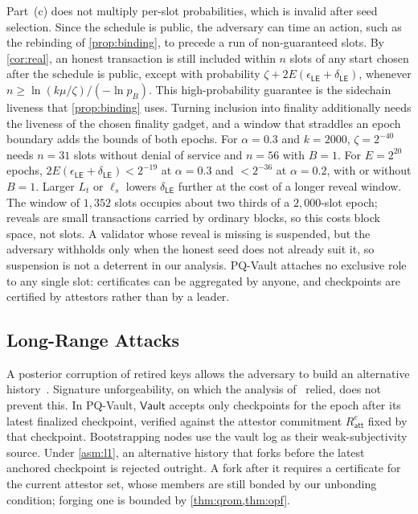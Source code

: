 \documentclass[10pt,journal,compsoc]{IEEEtran}
\theoremstyle{tplain}
\theoremstyle{tdef}
\theoremstyle{remark}
\newcommand{\Ratt}{R_{\mathsf{att}}}
\newcommand{\Vault}{\mathsf{Vault}}
\begin{document}
Part~(c) does not multiply per-slot probabilities, which is invalid after seed selection. Since the schedule is public, the adversary can time an action, such as the rebinding of \cref{prop:binding}, to precede a run of non-guaranteed slots. By \cref{cor:real}, an honest transaction is still included within $n$ slots of any start chosen after the schedule is public, except with probability $\zeta+2E(\epsilon_{\mathsf{LE}}+\delta_{\mathsf{LE}})$, whenever $n\ge\ln(k\mu/\zeta)/(-\ln p_B)$. This high-probability guarantee is the sidechain liveness that \cref{prop:binding} uses. Turning inclusion into finality additionally needs the liveness of the chosen finality gadget, and a window that straddles an epoch boundary adds the bounds of both epochs. For $\alpha=0.3$ and $k=2000$, $\zeta=2^{-40}$ needs $n=31$ slots without denial of service and $n=56$ with $B=1$. For $E=2^{20}$ epochs, $2E(\epsilon_{\mathsf{LE}}+\delta_{\mathsf{LE}})<2^{-19}$ at $\alpha=0.3$ and $<2^{-36}$ at $\alpha=0.2$, with or without $B=1$. Larger $L_t$ or $\ell_s$ lowers $\delta_{\mathsf{LE}}$ further at the cost of a longer reveal window. The window of $1{,}352$ slots occupies about two thirds of a $2{,}000$-slot epoch; reveals are small transactions carried by ordinary blocks, so this costs block space, not slots. A validator whose reveal is missing is suspended, but the adversary withholds only when the honest seed does not already suit it, so suspension is not a deterrent in our analysis. PQ-Vault attaches no exclusive role to any single slot: certificates can be aggregated by anyone, and checkpoints are certified by attestors rather than by a leader.

\subsection{Long-Range Attacks}\label{S-cons-longrange}

A posterior corruption of retired keys allows the adversary to build an alternative history~\cite{gazi2018stakebleeding,deirmentzoglou2019survey}. Signature unforgeability, on which the analysis of~\cite{myeprint} relied, does not prevent this. In PQ-Vault, $\Vault$ accepts only checkpoints for the epoch after its latest finalized checkpoint, verified against the attestor commitment $\Ratt^{e}$ fixed by that checkpoint. Bootstrapping nodes use the vault log as their weak-subjectivity source. Under \cref{asm:l1}, an alternative history that forks before the latest anchored checkpoint is rejected outright. A fork after it requires a certificate for the current attestor set, whose members are still bonded by our unbonding condition; forging one is bounded by \cref{thm:qrom,thm:opf}.
\end{document}
